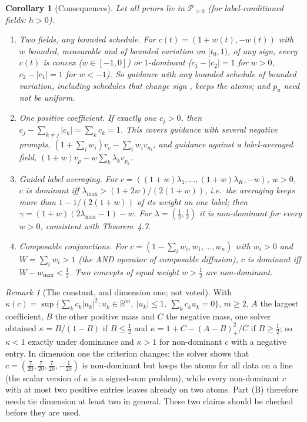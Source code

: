 \documentclass[11pt]{article}
\newtheorem{corollary}[theorem]{Corollary}
\theoremstyle{definition}
\theoremstyle{remark}
\newtheorem{remark}[theorem]{Remark}
\newcommand{\R}{\mathbb R}
\newcommand{\Ppos}{\mathcal P_{>0}}
\begin{document}
\begin{corollary}[Consequences]\label{cor:dominance}
Let all priors lie in $\Ppos$ (for label-conditioned fields: $h>0$).
\begin{enumerate}[label=(\roman*),leftmargin=2em]
\item \emph{Two fields, any bounded schedule.} For $c(t)=(1+w(t),-w(t))$ with $w$ bounded,
  measurable and of bounded variation on $[t_0,1)$, of any sign, every $c(t)$ is convex
  ($w\in[-1,0]$) or $1$-dominant ($c_1-|c_2|=1$ for $w>0$, $c_2-|c_1|=1$ for $w<-1$). So guidance
  with any bounded schedule of bounded variation, including schedules that change sign
  \cite{jain2025attraction}, keeps the atoms; and $p_u$ need not be uniform.
\item \emph{One positive coefficient.} If exactly one $c_j>0$, then
  $c_j-\sum_{k\ne j}|c_k|=\sum_kc_k=1$. This covers guidance with several negative prompts,
  $(1+\sum_iw_i)v_c-\sum_iw_iv_{n_i}$, and guidance against a label-averaged field,
  $(1+w)v_p-w\sum_k\lambda_kv_{p_k}$.
\item \emph{Guided label averaging.} For $c=((1+w)\lambda_1,\dots,(1+w)\lambda_K,-w)$, $w>0$, $c$ is
  dominant iff $\lambda_{\max}>(1+2w)/(2(1+w))$, i.e.\ the averaging keeps more than
  $1-1/(2(1+w))$ of its weight on one label; then $\gamma=(1+w)(2\lambda_{\max}-1)-w$. For
  $\lambda=(\frac12,\frac12)$ it is non-dominant for every $w>0$, consistent with Theorem~4.7.
\item \emph{Composable conjunctions.} For $c=(1-\sum_iw_i,w_1,\dots,w_n)$ with $w_i>0$ and
  $W=\sum_iw_i>1$ (the AND operator of composable diffusion), $c$ is dominant iff
  $W-w_{\max}<\frac12$. Two concepts of equal weight $w>\frac12$ are non-dominant.
\end{enumerate}
\end{corollary}

\begin{remark}[The constant, and dimension one; not voted]\label{rem:kappa}
With $\kappa(c)=\sup\{\sum_kc_k|u_k|^2:u_k\in\R^m,\ |u_k|\le1,\ \sum_kc_ku_k=0\}$, $m\ge2$, $A$ the
largest coefficient, $B$ the other positive mass and $C$ the negative mass, one solver obtained
$\kappa=B/(1-B)$ if $B\le\frac12$ and $\kappa=1+C-(A-B)_+^2/C$ if $B\ge\frac12$; so $\kappa<1$ exactly
under dominance and $\kappa>1$ for non-dominant $c$ with a negative entry. In dimension one the
criterion changes: the solver shows that $c=(\frac7{20},\frac7{20},\frac7{20},-\frac1{20})$ is
non-dominant but keeps the atoms for all data on a line (the scalar version of $\kappa$ is a
signed-sum problem), while every non-dominant $c$ with at most two positive entries leaves already
on two atoms. Part (B) therefore needs tie dimension at least two in general. These two claims
should be checked before they are used.
\end{remark}
\end{document}

